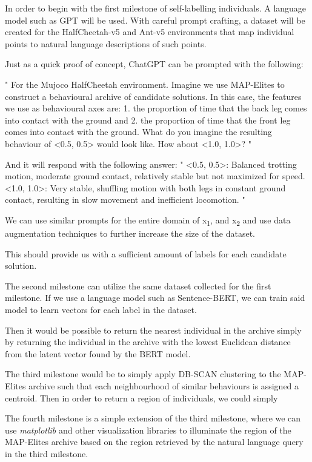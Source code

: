 \documentclass[11pt]{article}
\begin{document}
In order to begin with the first milestone of self-labelling individuals. A language model such as GPT
will be used. With careful prompt crafting, a dataset will be created for the HalfCheetah-v5 and Ant-v5 environments
that map individual points to natural language descriptions of such points.

Just as a quick proof of concept, ChatGPT can be prompted with the following:

"
For the Mujoco HalfCheetah environment. Imagine we use MAP-Elites to construct a behavioural archive of candidate solutions. In this case, the features we use as behavioural axes are: 1. the proportion of time that the back leg comes into contact with the ground and 2. the proportion of time that the front leg comes into contact with the ground. What do you imagine the resulting behaviour of <0.5, 0.5> would look like. How about <1.0, 1.0>?
"

And it will respond with the following answer:
"
<0.5, 0.5>: Balanced trotting motion, moderate ground contact, relatively stable but not maximized for speed.
<1.0, 1.0>: Very stable, shuffling motion with both legs in constant ground contact, resulting in slow movement and inefficient locomotion.
"

We can use similar prompts for the entire domain of x\textsubscript{1}, and x\textsubscript{2} and use data augmentation techniques
to further increase the size of the dataset.

This should provide us with a sufficient amount of labels for each candidate solution.

The second milestone can utilize the same dataset collected for the first milestone.
If we use a language model such as Sentence-BERT, we can train said model to learn vectors
for each label in the dataset.

Then it would be possible to return the nearest individual in the archive simply by returning
the individual in the archive with the lowest Euclidean distance from the latent vector
found by the BERT model.

The third milestone would be to simply apply DB-SCAN clustering to the MAP-Elites archive
such that each neighbourhood of similar behaviours is assigned a centroid. Then in order to return
 a region of individuals, we could simply

The fourth milestone is a simple extension of the third milestone, where we can use \emph{matplotlib}
and other visualization libraries to illuminate the region of the MAP-Elites archive based on the region
retrieved by the natural language query in the third milestone.
\end{document}
